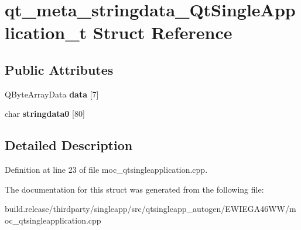 \hypertarget{structqt__meta__stringdata___qt_single_application__t}{}\section{qt\+\_\+meta\+\_\+stringdata\+\_\+\+Qt\+Single\+Application\+\_\+t Struct Reference}
\label{structqt__meta__stringdata___qt_single_application__t}
\subsection*{Public Attributes}
\begin{DoxyCompactItemize}
\item 
\mbox{\label{structqt__meta__stringdata___qt_single_application__t_a28f0f57ee1433d9d8db3bdcdcfb3ef0d}} 
Q\+Byte\+Array\+Data {\bfseries data} \mbox{[}7\mbox{]}
\item 
\mbox{\label{structqt__meta__stringdata___qt_single_application__t_a152d8081ab6599ae41b4fc8b363e7f78}} 
char {\bfseries stringdata0} \mbox{[}80\mbox{]}
\end{DoxyCompactItemize}


\subsection{Detailed Description}


Definition at line 23 of file moc\+\_\+qtsingleapplication.\+cpp.



The documentation for this struct was generated from the following file\+:\begin{DoxyCompactItemize}
\item 
build.\+release/thirdparty/singleapp/src/qtsingleapp\+\_\+autogen/\+E\+W\+I\+E\+G\+A46\+W\+W/moc\+\_\+qtsingleapplication.\+cpp\end{DoxyCompactItemize}
